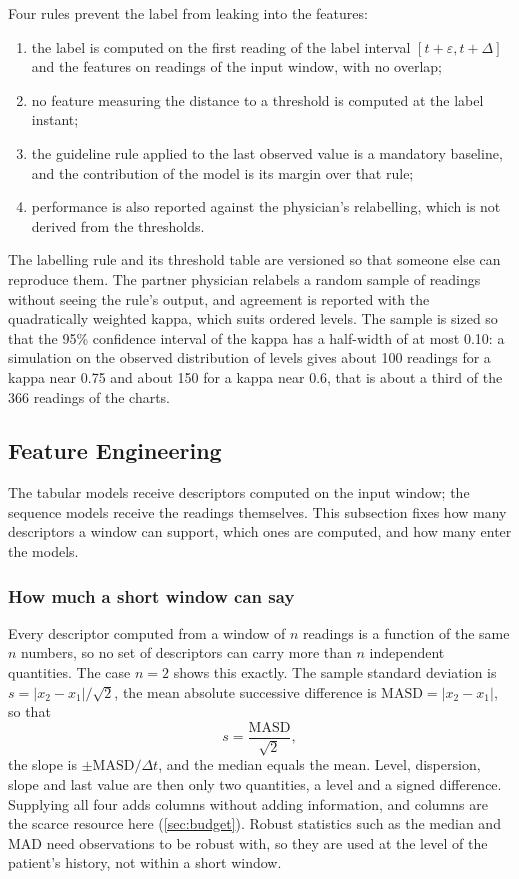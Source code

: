 Four rules prevent the label from leaking into the features:
\begin{enumerate}[nosep]
  \item the label is computed on the first reading of the label interval $[t+\varepsilon, t+\Delta]$ and the features on readings of the input window, with no overlap;
  \item no feature measuring the distance to a threshold is computed at the label instant;
  \item the guideline rule applied to the last observed value is a mandatory baseline, and the contribution of the model is its margin over that rule;
  \item performance is also reported against the physician's relabelling, which is not derived from the thresholds.
\end{enumerate}
The labelling rule and its threshold table are versioned so that someone else can reproduce them. The partner physician relabels a random sample of readings without seeing the rule's output, and agreement is reported with the quadratically weighted kappa, which suits ordered levels. The sample is sized so that the 95\% confidence interval of the kappa has a half-width of at most 0.10: a simulation on the observed distribution of levels gives about 100 readings for a kappa near 0.75 and about 150 for a kappa near 0.6, that is about a third of the 366 readings of the charts.

\subsection{Feature Engineering}\label{sec:feature-eng}

The tabular models receive descriptors computed on the input window; the sequence models receive the readings themselves. This subsection fixes how many descriptors a window can support, which ones are computed, and how many enter the models.

\subsubsection{How much a short window can say}\label{sec:ceiling}\label{sec:small-sample}

Every descriptor computed from a window of $n$ readings is a function of the same $n$ numbers, so no set of descriptors can carry more than $n$ independent quantities. The case $n = 2$ shows this exactly. The sample standard deviation is $s = \lvert x_2 - x_1\rvert / \sqrt{2}$, the mean absolute successive difference is $\mathrm{MASD} = \lvert x_2 - x_1 \rvert$, so that
\begin{equation}
  s = \frac{\mathrm{MASD}}{\sqrt{2}},
\end{equation}
the slope is $\pm\mathrm{MASD}/\Delta t$, and the median equals the mean. Level, dispersion, slope and last value are then only two quantities, a level and a signed difference. Supplying all four adds columns without adding information, and columns are the scarce resource here (\cref{sec:budget}). Robust statistics such as the median and MAD need observations to be robust with, so they are used at the level of the patient's history, not within a short window.

